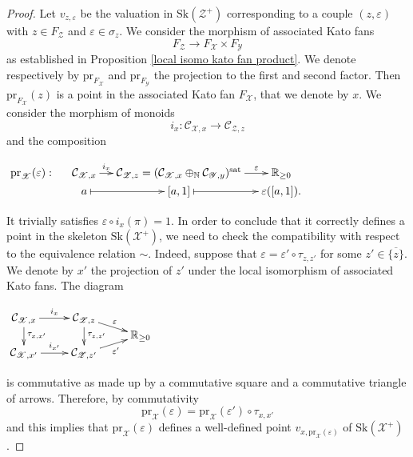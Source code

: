 \documentclass{amsart}%
\numberwithin{equation}{subsection}
\theoremstyle{plain2}
\theoremstyle{definition2}
\theoremstyle{stepstyle}
\theoremstyle{point}
\theoremstyle{subpoint}
\newcommand{\N}{\ensuremath{\mathbb{N}}}
\newcommand{\R}{\ensuremath{\mathbb{R}}}
\newcommand{\cX}{\ensuremath{\mathscr{X}}}
\newcommand{\caC}{\ensuremath{\mathcal{C}}}
\newcommand{\cY}{\ensuremath{\mathscr{Y}}}
\newcommand{\cZ}{\ensuremath{\mathscr{Z}}}
\renewcommand{\R}{\ensuremath{\mathbb{R}}}
\renewcommand{\cZ}{\ensuremath{\mathscr{Z}}}
\renewcommand{\cY}{\ensuremath{\mathscr{Y}}}
\newcommand{\pr}{\mathrm{pr}}
\newcommand{\Sk}{\mathrm{Sk}}
\begin{document}
\begin{proof}
Let $v_{z,\varepsilon}$ be the valuation in $\Sk(\cZ^+)$ corresponding to a couple $(z,\varepsilon)$ with $z \in F_{\cZ}$ and $\varepsilon \in \sigma_z$. We consider the morphism of associated Kato fans $$F_{\cZ} \rightarrow F_{\cX} \times F_{\cY}$$ as established in Proposition \ref{local isomo kato fan product}. We denote respectively by $\pr_{F_\cX}$ and $\pr_{F_\cY}$ the projection to the first and second factor. Then $\pr_{F_{\cX}}(z)$ is a point in the associated Kato fan $F_{\cX}$, that we denote by $x$. We consider the morphism of monoids $$i_x: \caC_{\cX,x} \rightarrow \caC_{\cZ,z}$$ and the composition \begin{center}
$\begin{gathered}
\xymatrixcolsep{1pc} \xymatrixrowsep{0pc} \xymatrix{
    \pr_{\cX}(\varepsilon): & \caC_{\cX,x} \ar[r]^-{i_x} & \caC_{\cZ,z}= (\caC_{\cX,x} \oplus_{\N} \caC_{\cY,y})^{\text{sat}} \ar[r]^-{\varepsilon} & \R_{\geq 0} \\
   & a \ar@{|->}[r] & [a,1] \ar@{|->}[r] & \varepsilon([a,1]). \\
}
\end{gathered}$\end{center} It trivially satisfies $\varepsilon \circ i_x(\pi)=1$. In order to conclude that it correctly defines a point in the skeleton $\Sk(\cX^+)$, we need to check the compatibility with respect to the equivalence relation $\sim$. Indeed, suppose that $\varepsilon = \varepsilon' \circ \tau_{z,z'}$ for some $z' \in \overline{\{z\}}$. We denote by $x'$ the projection of $z'$ under the local isomorphism of associated Kato fans. The diagram
\begin{center}
$\begin{gathered}
\xymatrixcolsep{2pc} \xymatrixrowsep{0pc} \xymatrix{
    \caC_{\cX,x} \ar[r]^-{i_x} \ar[dd]^{\tau_{x,x'}} & \caC_{\cZ,z} \ar[rd]^-{\varepsilon} \ar[dd]^{\tau_{z,z'}} & \\
    & & \R_{\geq 0} \\
    \caC_{\cX,x'} \ar[r]^-{i_{x'}} & \caC_{\cZ,z'} \ar[ru]_-{\varepsilon'} &  \\
}
\end{gathered}$\end{center} is commutative as made up by a commutative square and a commutative triangle of arrows. Therefore, by commutativity $$\pr_{\cX}(\varepsilon)= \pr_{\cX}(\varepsilon') \circ \tau_{x,x'}$$ and this implies that $\pr_{\cX}(\varepsilon)$ defines a well-defined point $v_{x,\pr_{\cX}(\varepsilon)}$ of $\Sk(\cX^+)$.


\end{proof}
\end{document}
